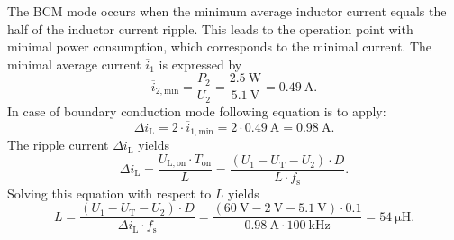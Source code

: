 

\begin{solutionblock}
	The BCM mode occurs when the minimum average inductor current equals the half of the inductor current ripple.
	This leads to the operation point with minimal power consumption, which corresponds to the minimal current.
	The minimal average current $\overline{i}_\mathrm{1}$ is expressed by
	\begin{equation*}
		\overline{i}_\mathrm{2,min} = \frac{P_\mathrm{2}}{U_\mathrm{2}} = \frac{\SI{2.5}{\watt}} {\SI{5.1}{\volt}} = \SI{0.49}{\ampere}.
	\end{equation*}
	In case of boundary conduction mode following equation is to apply:
	\begin{equation*}
		\Delta i_\mathrm{L}= 2 \cdot \overline{i}_\mathrm{1,min} = 2 \cdot \SI{0.49}{\ampere} = \SI{0.98}{\ampere}.
	\end{equation*}
	The ripple current $\Delta i_\mathrm{L}$ yields
	\begin{equation*}
		\Delta i_\mathrm{L}=\frac{U_\mathrm{L,on} \cdot T_\mathrm{on}}{L}
		=\frac{(U_\mathrm{1} - U_\mathrm{T} - U_\mathrm{2}) \cdot D}{L \cdot f_\mathrm{s}}.
	\end{equation*}
	Solving this equation with respect to $L$ yields
	\begin{equation*}
		L= \frac{(U_\mathrm{1} -U_\mathrm{T} - U_\mathrm{2}) \cdot D}{\Delta i_\mathrm{L} \cdot f_\mathrm{s}}
		= \frac{(\SI{60}{\volt} - \SI{2}{\volt} - \SI{5.1}{\volt}) \cdot 0.1} {\SI{0.98}{\ampere} \cdot \SI{100}{\kilo\hertz}}
		= \SI{54}{\micro\henry}.
	\end{equation*}
\end{solutionblock}


